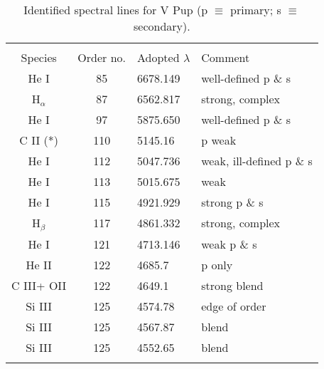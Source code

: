 \documentclass[useAMS,usenatbib]{mnras}                                                                           \usepackage[pdftex]{graphicx}
\begin{document}
\begin{table}
\begin{center}
\caption{Identified spectral lines for V Pup (p $\equiv$ primary; s $\equiv$ secondary).
\label{tbl-3}}
\begin{tabular}{ccll}
  & & &  \\
\multicolumn{1}{c}{Species}  & \multicolumn{1}{c}{Order no.} &
\multicolumn{1}{l}{Adopted $\lambda$} & \multicolumn{1}{l}{Comment}  \\
He I         & 85        &  6678.149  &   well-defined p \& s \\
H$_{\alpha}$ & 87        &  6562.817  &   strong, complex      \\
He I         & 97       &  5875.650  &  well-defined p \& s \\
C II      (*)   & 110      &  5145.16  & p weak   \\
He I         & 112      &  5047.736  & weak, ill-defined p \& s  \\
He I         & 113      &  5015.675  &  weak\\
He I         & 115      &  4921.929   & strong p \& s   \\
H$_{\beta}$  & 117      &  4861.332  &  strong, complex      \\
He I         & 121      &  4713.146  & weak p \& s \\
He II        & 122      &  4685.7    &  p only \\
C III+ OII   & 122      &  4649.1 &   strong blend   \\
Si III        & 125      &  4574.78 &  edge of order     \\
Si III        & 125      &  4567.87  &  blend \\
Si III        & 125      &  4552.65  & blend     \\
\hline \\
\end{tabular}
\end{center}
\end{table}
\end{document}
